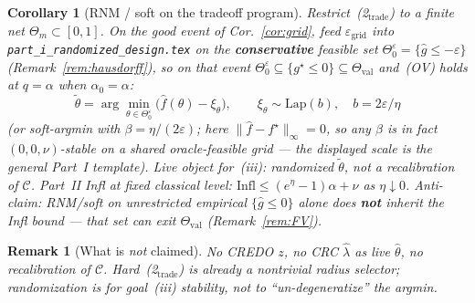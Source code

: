 \documentclass[11pt]{article}
\newtheorem{corollary}{Corollary}
\newtheorem{remark}{Remark}
\begin{document}
\begin{corollary}[RNM / soft on the tradeoff program]
\label{cor:plug}
Restrict~(2$_{\mathrm{trade}}$) to a finite net $\Theta_m\subset[0,1]$.
On the good event of Cor.~\ref{cor:grid}, feed $\varepsilon_{\mathrm{grid}}$ into
\texttt{part\_i\_randomized\_design.tex} on the
\textbf{conservative} feasible set $\Theta_0^\varepsilon=\{\hat g\le-\varepsilon\}$
(Remark~\ref{rem:hausdorff}), so on that event
$\Theta_0^\varepsilon\subseteq\{g^\star\le 0\}\subseteq\Theta_{\mathrm{val}}$ and~(OV) holds at
$q=\alpha$ when $\alpha_0=\alpha$:
\[
\tilde\theta=\arg\min_{\theta\in\Theta_0^\varepsilon}
\bigl(\hat f(\theta)-\xi_\theta\bigr),\qquad
\xi_\theta\sim\mathrm{Lap}(b),\quad b=2\varepsilon/\eta
\]
(or soft-argmin with $\beta=\eta/(2\varepsilon)$; here $\|\hat f-f^\star\|_\infty=0$, so any
$\beta$ is in fact $(0,0,\nu)$-stable on a shared oracle-feasible grid --- the displayed
scale is the general Part~I template).
Live object for~(iii): randomized $\tilde\theta$, not a recalibration of $\mathcal{C}$.
Part~II Infl at fixed classical level:
$\mathrm{Infl}\le(e^\eta-1)\alpha+\nu$ as $\eta\downarrow 0$.
\textit{Anti-claim:} RNM/soft on unrestricted empirical $\{\hat g\le 0\}$ alone does
\textbf{not} inherit the Infl bound --- that set can exit $\Theta_{\mathrm{val}}$
(Remark~\ref{rem:FV}).
\end{corollary}

\begin{remark}[What is \emph{not} claimed]
No CREDO $z$, no CRC $\hat\lambda$ as live $\hat\theta$, no recalibration of $\mathcal{C}$.
Hard~(2$_{\mathrm{trade}}$) is already a nontrivial radius selector; randomization is for goal~(iii) stability, not to ``un-degeneratize'' the argmin.
\end{remark}
\end{document}
